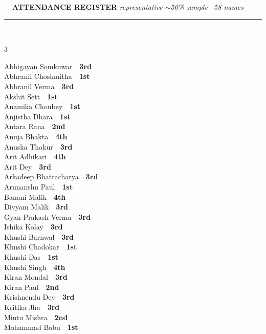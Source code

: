 \documentclass[11pt,a4paper]{article}
\begin{document}
\vspace{3pt}\noindent
{\footnotesize\bfseries\color{Slate}\faListOl~~ATTENDANCE REGISTER}%
\hfill{\scriptsize\itshape\color{Slate}representative $\sim$50\% sample \textperiodcentered\ 58 names}\\[3pt]
{\color{Line}\rule{\linewidth}{0.5pt}}\\[5pt]
\begingroup\footnotesize\setlength{\columnsep}{20pt}\setlength{\parskip}{1pt}%
\begin{multicols}{3}\raggedright
Abhigayan Somkuwar~\dotfill~\textbf{3rd}\\
Abhranil Choshmitha~\dotfill~\textbf{1st}\\
Abhranil Verma~\dotfill~\textbf{3rd}\\
Akshit Sett~\dotfill~\textbf{1st}\\
Anamika Choubey~\dotfill~\textbf{1st}\\
Anjistha Dhara~\dotfill~\textbf{1st}\\
Antara Rana~\dotfill~\textbf{2nd}\\
Anuja Bhakta~\dotfill~\textbf{4th}\\
Anuska Thakur~\dotfill~\textbf{3rd}\\
Arit Adhikari~\dotfill~\textbf{4th}\\
Arit Dey~\dotfill~\textbf{3rd}\\
Arkadeep Bhattacharya~\dotfill~\textbf{3rd}\\
Arunanshu Paul~\dotfill~\textbf{1st}\\
Banani Malik~\dotfill~\textbf{4th}\\
Divyam Malik~\dotfill~\textbf{3rd}\\
Gyan Prakash Verma~\dotfill~\textbf{3rd}\\
Ishika Kolay~\dotfill~\textbf{3rd}\\
Khushi Barnwal~\dotfill~\textbf{3rd}\\
Khushi Chadokar~\dotfill~\textbf{1st}\\
Khushi Das~\dotfill~\textbf{1st}\\
Khushi Singh~\dotfill~\textbf{4th}\\
Kiran Mondal~\dotfill~\textbf{3rd}\\
Kiran Paul~\dotfill~\textbf{2nd}\\
Krishnendu Dey~\dotfill~\textbf{3rd}\\
Kritika Jha~\dotfill~\textbf{3rd}\\
Mintu Mishra~\dotfill~\textbf{2nd}\\
Mohammad Babu~\dotfill~\textbf{1st}\\

\end{multicols}
\end{document}
